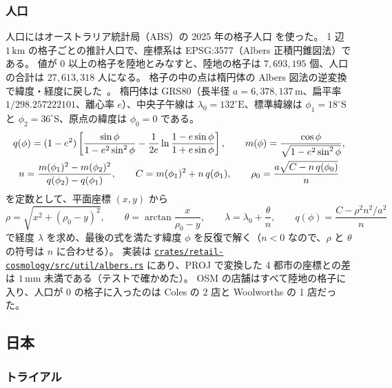\documentclass[a4paper,11pt]{ltjsarticle}
\newcommand{\repourl}{https://github.com/inuverse44/retail-cosmology}
\begin{document}
\subsubsection{人口}

人口にはオーストラリア統計局（ABS）の 2025 年の格子人口 \cite{ABSPopGrid2025} を使った。
1 辺 $1\,\mathrm{km}$ の格子ごとの推計人口で、座標系は EPSG:3577（Albers 正積円錐図法）である。
値が $0$ 以上の格子を陸地とみなすと、陸地の格子は $7{,}693{,}195$ 個、人口の合計は $27{,}613{,}318$ 人になる。
格子の中の点は楕円体の Albers 図法の逆変換で緯度・経度に戻した~\cite{Snyder1987}。
楕円体は GRS80（長半径 $a = 6{,}378{,}137\,\mathrm{m}$、扁平率 $1/298.257222101$、離心率 $e$）、中央子午線は $\lambda_0 = 132^\circ\mathrm{E}$、標準緯線は $\phi_1 = 18^\circ\mathrm{S}$ と $\phi_2 = 36^\circ\mathrm{S}$、原点の緯度は $\phi_0 = 0$ である。
\begin{gather}
  q(\phi) = (1 - e^2) \left[ \frac{\sin\phi}{1 - e^2 \sin^2\phi} - \frac{1}{2e} \ln \frac{1 - e \sin\phi}{1 + e \sin\phi} \right], \qquad
  m(\phi) = \frac{\cos\phi}{\sqrt{1 - e^2 \sin^2\phi}}, \notag \\
  n = \frac{m(\phi_1)^2 - m(\phi_2)^2}{q(\phi_2) - q(\phi_1)}, \qquad
  C = m(\phi_1)^2 + n\, q(\phi_1), \qquad
  \rho_0 = \frac{a \sqrt{C - n\, q(\phi_0)}}{n}
\end{gather}
を定数として、平面座標 $(x, y)$ から
\begin{equation}
  \rho = \sqrt{x^2 + (\rho_0 - y)^2}, \qquad
  \theta = \arctan \frac{x}{\rho_0 - y}, \qquad
  \lambda = \lambda_0 + \frac{\theta}{n}, \qquad
  q(\phi) = \frac{C - \rho^2 n^2 / a^2}{n}
\end{equation}
で経度 $\lambda$ を求め、最後の式を満たす緯度 $\phi$ を反復で解く（$n < 0$ なので、$\rho$ と $\theta$ の符号は $n$ に合わせる）。
実装は \href{\repourl/blob/main/crates/retail-cosmology/src/util/albers.rs}{\nolinkurl{crates/retail-cosmology/src/util/albers.rs}} にあり、PROJ で変換した 4 都市の座標との差は $1\,\mathrm{mm}$ 未満である（テストで確かめた）。
OSM の店舗はすべて陸地の格子に入り、人口が $0$ の格子に入ったのは Coles の 2 店と Woolworths の 1 店だった。

\subsection{日本}
\label{sec:data-jp}

\subsubsection{トライアル}
\end{document}
